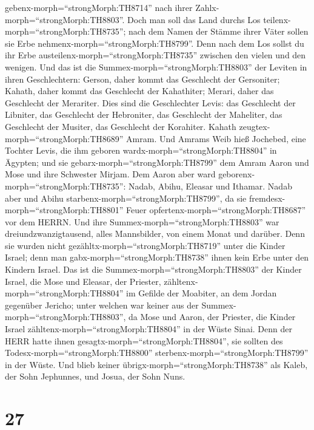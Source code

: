 gebenx-morph=``strongMorph:TH8714'' nach ihrer
Zahlx-morph=``strongMorph:TH8803''.  Doch man soll das Land
durchs Los teilenx-morph=``strongMorph:TH8735''; nach dem Namen der
Stämme ihrer Väter sollen sie Erbe nehmenx-morph=``strongMorph:TH8799''.
 Denn nach dem Los sollst du ihr Erbe
austeilenx-morph=``strongMorph:TH8735'' zwischen den vielen und den
wenigen.  Und das ist die
Summex-morph=``strongMorph:TH8803'' der Leviten in ihren Geschlechtern:
Gerson, daher kommt das Geschlecht der Gersoniter; Kahath, daher kommt
das Geschlecht der Kahathiter; Merari, daher das Geschlecht der
Merariter.  Dies sind die Geschlechter Levis: das
Geschlecht der Libniter, das Geschlecht der Hebroniter, das Geschlecht
der Maheliter, das Geschlecht der Musiter, das Geschlecht der Korahiter.
Kahath zeugtex-morph=``strongMorph:TH8689'' Amram.  Und
Amrams Weib hieß Jochebed, eine Tochter Levis, die ihm geboren
wardx-morph=``strongMorph:TH8804'' in Ägypten; und sie
gebarx-morph=``strongMorph:TH8799'' dem Amram Aaron und Mose und ihre
Schwester Mirjam.  Dem Aaron aber ward
geborenx-morph=``strongMorph:TH8735'': Nadab, Abihu, Eleasar und
Ithamar.  Nadab aber und Abihu
starbenx-morph=``strongMorph:TH8799'', da sie
fremdesx-morph=``strongMorph:TH8801'' Feuer
opfertenx-morph=``strongMorph:TH8687'' vor dem HERRN.  Und
ihre Summex-morph=``strongMorph:TH8803'' war dreiundzwanzigtausend,
alles Mannsbilder, von einem Monat und darüber. Denn sie wurden nicht
gezähltx-morph=``strongMorph:TH8719'' unter die Kinder Israel; denn man
gabx-morph=``strongMorph:TH8738'' ihnen kein Erbe unter den Kindern
Israel.  Das ist die Summex-morph=``strongMorph:TH8803''
der Kinder Israel, die Mose und Eleasar, der Priester,
zähltenx-morph=``strongMorph:TH8804'' im Gefilde der Moabiter, an dem
Jordan gegenüber Jericho;  unter welchen war keiner aus der
Summex-morph=``strongMorph:TH8803'', da Mose und Aaron, der Priester,
die Kinder Israel zähltenx-morph=``strongMorph:TH8804'' in der Wüste
Sinai.  Denn der HERR hatte ihnen
gesagtx-morph=``strongMorph:TH8804'', sie sollten des
Todesx-morph=``strongMorph:TH8800''
sterbenx-morph=``strongMorph:TH8799'' in der Wüste. Und blieb keiner
übrigx-morph=``strongMorph:TH8738'' als Kaleb, der Sohn Jephunnes, und
Josua, der Sohn Nuns.

\hypertarget{section-26}{%
\section{27}\label{section-26}}

